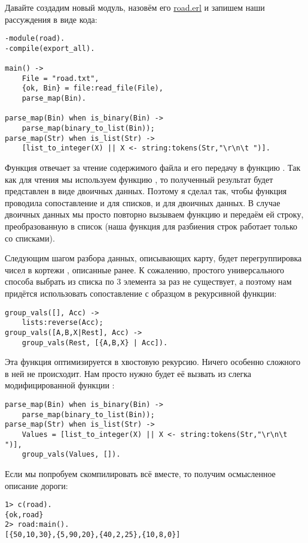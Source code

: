 Давайте создадим новый модуль, назовём его \href{http://learnyousomeerlang.com/static/erlang/road.erl}{road.erl} и запишем наши рассуждения в виде кода:
\begin{lstlisting}[style=erlang]
-module(road).
-compile(export_all).
 
main() ->
    File = "road.txt",
    {ok, Bin} = file:read_file(File),
    parse_map(Bin).
 
parse_map(Bin) when is_binary(Bin) ->
    parse_map(binary_to_list(Bin));
parse_map(Str) when is_list(Str) ->
    [list_to_integer(X) || X <- string:tokens(Str,"\r\n\t ")].
\end{lstlisting}

Функция  отвечает за чтение содержимого файла и его передачу в функцию .
Так как для чтения мы используем функцию , то полученный результат будет представлен в виде двоичных данных.
Поэтому я сделал так, чтобы функция  проводила сопоставление и для списков, и для двоичных данных.
В случае двоичных данных мы просто повторно вызываем функцию и передаём ей строку, преобразованную в список (наша функция для разбиения строк работает только со списками).

Следующим шагом разбора данных, описывающих карту, будет перегруппировка чисел в кортежи , описанные ранее.
К сожалению, простого универсального способа выбрать из списка по 3 элемента за раз не существует, а поэтому нам придётся использовать сопоставление с образцом в рекурсивной функции:
\begin{lstlisting}[style=erlang]
group_vals([], Acc) ->
    lists:reverse(Acc);
group_vals([A,B,X|Rest], Acc) ->
    group_vals(Rest, [{A,B,X} | Acc]).
\end{lstlisting}

Эта функция оптимизируется в хвостовую рекурсию.
Ничего особенно сложного в ней не происходит.
Нам просто нужно будет её вызвать из слегка модифицированной функции :
\begin{lstlisting}[style=erlang]
parse_map(Bin) when is_binary(Bin) ->
    parse_map(binary_to_list(Bin));
parse_map(Str) when is_list(Str) ->
    Values = [list_to_integer(X) || X <- string:tokens(Str,"\r\n\t ")],
    group_vals(Values, []).
\end{lstlisting}

Если мы попробуем скомпилировать всё вместе, то получим осмысленное описание дороги:
\begin{lstlisting}[style=erlang]
1> c(road).
{ok,road}
2> road:main().
[{50,10,30},{5,90,20},{40,2,25},{10,8,0}]
\end{lstlisting}


